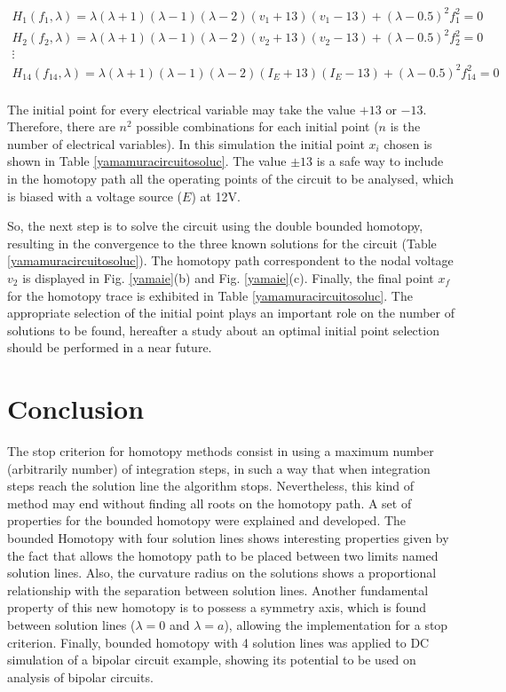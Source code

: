 \documentclass{elex}
\begin{document}
{\begin{displaymath}
\begin{array}{c}
H_1(f_1,\lambda)=\lambda(\lambda+1)(\lambda-1)(\lambda-2)(v_1+13)(v_1-13)+(\lambda-0.5)^2 f_1^2=0\\
H_2(f_2,\lambda)=\lambda(\lambda+1)(\lambda-1)(\lambda-2)(v_2+13)(v_2-13)+(\lambda-0.5)^2 f_2^2=0\\
\vdots \\
H_{14}(f_{14},\lambda)=\lambda(\lambda+1)(\lambda-1)(\lambda-2)(I_E+13)(I_{E}-13)+(\lambda-0.5)^2 f_{14}^2=0\\
\end{array}
\end{displaymath}

The initial point for every electrical variable may take the value $+13$ or $-13$. Therefore, there are $n^2$ possible combinations for each initial point ($n$ is the number of electrical variables). In this simulation the initial point $x_i$ chosen is shown in Table \ref{yamamuracircuitosoluc}. The value $\pm 13$ is a safe way to include in the homotopy path all the operating points of the circuit to be analysed, which is biased with a voltage source ($E$) at 12V.

So, the next step is to solve the circuit using the double bounded homotopy, resulting in the convergence to the three known solutions for the circuit (Table \ref{yamamuracircuitosoluc}). The homotopy path correspondent to the nodal voltage $v_2$ is displayed in Fig. \ref{yamaie}(b) and Fig. \ref{yamaie}(c). Finally, the final point $x_f$ for the homotopy trace is exhibited in Table \ref{yamamuracircuitosoluc}. The appropriate selection of the initial point plays an important role on the number of solutions to be found, hereafter a study about an optimal initial point selection should be performed in a near future.


\section{Conclusion}
The stop criterion for homotopy methods consist in using a maximum number (arbitrarily number) of integration steps, in such a way that when integration steps reach the solution line the algorithm stops. Nevertheless, this kind of method may end without finding all roots on the homotopy path. A set of properties for the bounded homotopy were explained and developed. The bounded Homotopy with four solution lines shows interesting properties given by the fact that allows the homotopy path to be placed between two limits named solution lines. Also, the curvature radius on the solutions shows a proportional relationship with the separation between solution lines. Another fundamental property of this new homotopy is to possess a symmetry axis, which is found between solution lines ($\lambda=0$ and $\lambda=a$), allowing the implementation for a stop criterion. Finally, bounded homotopy with 4 solution lines was applied to DC simulation of a bipolar circuit example, showing its potential to be used on analysis of bipolar circuits.

}
\end{document}
